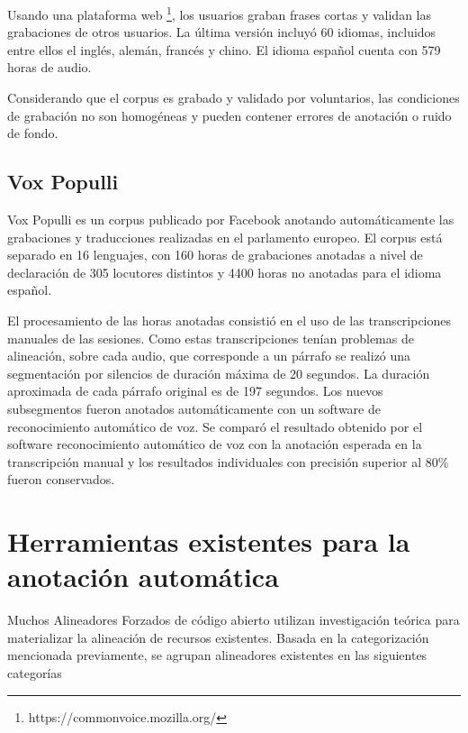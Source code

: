 Usando una plataforma web \footnote{https://commonvoice.mozilla.org/}, los usuarios graban frases cortas y validan las grabaciones de otros usuarios. La última versión  incluyó 60 idiomas, incluidos entre ellos el inglés, alemán, francés y chino. El idioma español cuenta con 579 horas de audio.

Considerando que el corpus es grabado y validado por voluntarios, las condiciones de grabación no son homogéneas y pueden contener errores de anotación o ruido de fondo.

\subsection{Vox Populli}

Vox Populli \cite{voxpopulli} es un corpus publicado por Facebook anotando automáticamente las grabaciones y traducciones realizadas en el parlamento europeo. El corpus está separado en 16 lenguajes, con 160 horas de grabaciones anotadas a nivel de declaración de 305 locutores distintos y 4400 horas no anotadas para el idioma español. 

El procesamiento de las horas anotadas consistió en el uso de las transcripciones manuales de las sesiones. Como estas transcripciones tenían problemas de alineación, sobre cada audio, que corresponde a un párrafo se realizó una segmentación por silencios de duración máxima de 20 segundos. La duración aproximada de cada párrafo original es de 197 segundos. Los nuevos subsegmentos fueron anotados automáticamente con un software de reconocimiento automático de voz. Se comparó el resultado obtenido por el software reconocimiento automático de voz con la anotación esperada en la transcripción manual y los resultados individuales con precisión superior al 80\% fueron conservados.



\section{Herramientas existentes para la anotación automática}

Muchos Alineadores Forzados de código abierto utilizan investigación teórica para materializar la alineación de recursos existentes. Basada en la categorización mencionada previamente, se agrupan alineadores existentes en las siguientes categorías


